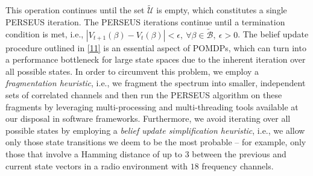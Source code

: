 \documentclass[10pt,twocolumn]{IEEEtran}
\begin{document}
This operation continues until the set $\tilde{\mathcal{U}}$ is empty, which constitutes a single PERSEUS iteration. The PERSEUS iterations continue until a termination condition is met, i.e., $|V_{t{+}1}(\beta){-}V_{t}(\beta)|{<}\epsilon,\ \forall \beta{\in} \tilde{\mathcal{B}},\ \epsilon{>}0$. The belief update procedure outlined in \eqref{11} is an essential aspect of POMDPs, which can turn into a performance bottleneck for large state spaces due to the inherent iteration over all possible states. In order to circumvent this problem, we employ a \emph{fragmentation heuristic}, i.e., we fragment the spectrum into smaller, independent sets of correlated channels and then run the PERSEUS algorithm on these fragments by leveraging multi-processing and multi-threading tools available at our disposal in software frameworks. Furthermore, we avoid iterating over all possible states by employing a \emph{belief update simplification heuristic}, i.e., we allow only those state transitions we deem to be the most probable -- for example, only those that involve a Hamming distance of up to $3$ between the previous and current state vectors in a radio environment with $18$ frequency channels.
\vspace{-4mm}
\end{document}

